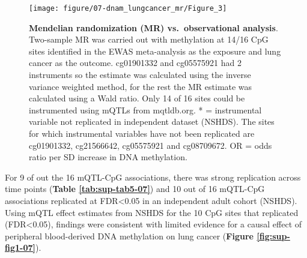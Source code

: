 \documentclass[11pt,oneside]{bristolthesis}
\begin{document}
\begin{figure}

{\centering \texttt{[image: figure/07-dnam\_lungcancer\_mr/Figure\_3]} 

}

\caption[Mendelian randomization (MR) vs.~observational analysis]{\textbf{Mendelian randomization (MR) vs.~observational analysis}. Two-sample MR was carried out with methylation at 14/16 CpG sites identified in the EWAS meta-analysis as the exposure and lung cancer as the outcome. cg01901332 and cg05575921 had 2 instruments so the estimate was calculated using the inverse variance weighted method, for the rest the MR estimate was calculated using a Wald ratio. Only 14 of 16 sites could be instrumented using mQTLs from mqtldb.org. * = instrumental variable not replicated in independent dataset (NSHDS). The sites for which instrumental variables have not been replicated are cg01901332, cg21566642, cg05575921 and cg08709672. OR = odds ratio per SD increase in DNA methylation.}\label{fig:fig3-07}
\end{figure}
For 9 of out the 16 mQTL-CpG associations, there was strong replication across time points (\textbf{Table \ref{tab:sup-tab5-07}}) and 10 out of 16 mQTL-CpG associations replicated at FDR\textless0.05 in an independent adult cohort (NSHDS). Using mQTL effect estimates from NSHDS for the 10 CpG sites that replicated (FDR\textless0.05), findings were consistent with limited evidence for a causal effect of peripheral blood-derived DNA methylation on lung cancer (\textbf{Figure \ref{fig:sup-fig1-07}}).
\end{document}
